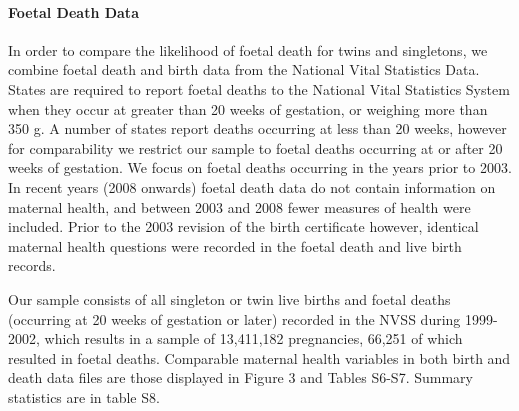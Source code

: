 \documentclass[12pt]{article}
\begin{document}
\paragraph{Foetal Death Data}
In order to compare the likelihood of foetal death for twins and singletons, we combine foetal death and birth data from the National Vital Statistics Data. States are required to report foetal deaths to the National Vital Statistics System when they occur at greater than 20 weeks of gestation, or weighing more than 350 g. A number of states report deaths occurring at less than 20 weeks, however for comparability we restrict our sample to foetal deaths occurring at or after 20 weeks of gestation.  We focus on foetal deaths occurring in the years prior to 2003.  In recent years (2008 onwards) foetal death data do not contain information on maternal health, and between 2003 and 2008 fewer measures of health were included.  Prior to the 2003 revision of the birth certificate however, identical maternal health questions were recorded in the foetal death and live birth records.

Our sample consists of all singleton or twin live births and foetal deaths (occurring at 20 weeks of gestation or later) recorded in the NVSS during 1999-2002, which results in a sample of 13,411,182 pregnancies, 66,251 of which resulted in foetal deaths. Comparable maternal health variables in both birth and death data files are those displayed in Figure 3 and Tables S6-S7. %
Summary statistics are in table S8.



\end{document}
